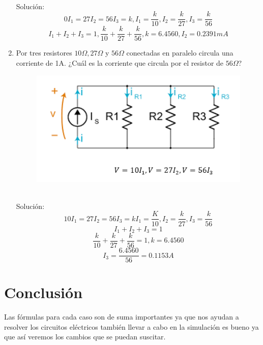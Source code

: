 \begin{enumerate}
	\\
	Solución:
	\begin{equation*}
		0I_{1}=27I_{2}=56I_{3}=k, I_{1}=\frac{k}{10}, I_{2}=\frac{k}{27}, I_{3}=\frac{k}{56}
	\end{equation*}
	\begin{equation*}
		I_{1}+ I_{2}+I_{3}=1,  \frac{k}{10}+\frac{k}{27}+\frac{k}{56}, k=6.4560, I_{2}= 0.2391mA
	\end{equation*}
	\item Por tres resistores $10\Omega, 27\Omega$ y $56\Omega$ conectadas en paralelo circula una corriente de 1A. ¿Cuál es la corriente que circula por el resistor de $56\Omega$?
	\begin{figure}[h]
		\centering
		\includegraphics[scale=1]{imagenes/3}
	\end{figure}
	\\Solución:
	\begin{equation*}
		10I_{1}=27I_{2}=56I_{3}=k I_{1}=\frac{K}{10},I_{2}=\frac{k}{27},I_{3}=\frac{k}{56}
	\end{equation*}
	\begin{equation*}
		I_{1}+ I_{2}+I_{3}=1
	\end{equation*}
	\begin{equation*}
		\frac{k}{10}+\frac{k}{27}+\frac{k}{56}=1, k=6.4560  
	\end{equation*}
	\begin{equation*}
		I_{3}=\frac{6.4560}{56}=0.1153 A
	\end{equation*}
\end{enumerate}
\section{Conclusión}
Las fórmulas para cada caso son de suma importantes ya que nos ayudan a resolver los circuitos eléctricos también llevar a cabo en la simulación es bueno ya que así veremos los cambios que se puedan suscitar.


